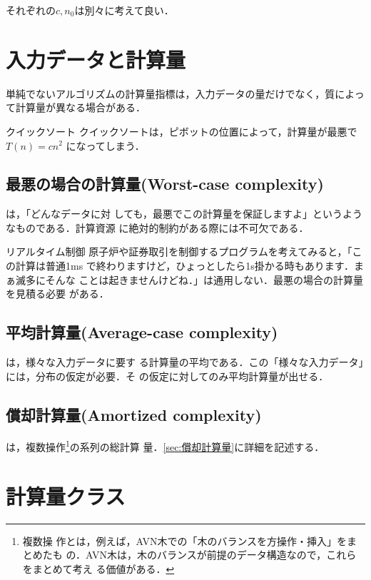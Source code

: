 それぞれの$c, n_0$は別々に考えて良い．


\section{入力データと計算量}
単純でないアルゴリズムの計算量指標は，入力データの量だけでなく，質によっ
て計算量が異なる場合がある．

\begin{myexample}{クイックソート}
 クイックソートは，ピボットの位置によって，計算量が最悪で$T(n) = c n^2$
 になってしまう．
\end{myexample}

\subsection{最悪の場合の計算量(Worst-case complexity)}
は，「どんなデータに対
しても，最悪でこの計算量を保証しますよ」というようなものである．計算資源
に絶対的制約がある際には不可欠である．

\begin{myexample}{リアルタイム制御}
 原子炉や証券取引を制御するプログラムを考えてみると，「この計算は普通1ms
 で終わりますけど，ひょっとしたら1s掛かる時もあります．まぁ滅多にそんな
 ことは起きませんけどね．」は通用しない．最悪の場合の計算量を見積る必要
 がある．
\end{myexample}

\subsection{平均計算量(Average-case complexity)}
は，様々な入力データに要す
る計算量の平均である．この「様々な入力データ」には，分布の仮定が必要．そ
の仮定に対してのみ平均計算量が出せる．

\subsection{償却計算量(Amortized complexity)}
は，複数操作\footnote{複数操
作とは，例えば，AVN木での「木のバランスを方操作・挿入」をまとめたも
の．AVN木は，木のバランスが前提のデータ構造なので，これらをまとめて考え
る価値がある．}の系列の総計算
量．\ref{sec:償却計算量}に詳細を記述する．


\section{計算量クラス}
